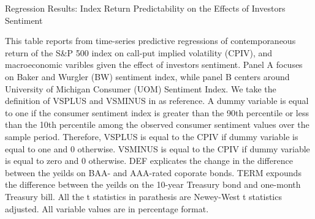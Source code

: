 \begin{table}[h]

\caption{Regression Results: Index Return Predictability on the Effects of Investors Sentiment}\label{table:sentiment}
\begin{threeparttable}

\medskip

{\scriptsize 
This table reports from time-series predictive regressions of contemporaneous return of the S\&P 500 index on call-put implied volatility (CPIV), and macroeconomic varibles given the effect of investors sentiment. Panel A focuses on Baker and Wurgler (BW) sentiment index, while panel B centers around University of Michigan Consumer (UOM) Sentiment Index. We take the definition of VSPLUS and VSMINUS in \textcite{atilgan2015implied} as reference. A dummy variable is equal to one if the consumer sentiment index is greater than the 90th percentile or less than the 10th percentile among the observed consumer sentiment values over the sample period. Therefore, VSPLUS is equal to the CPIV if dummy variable is equal to one and 0 otherwise. VSMINUS is equal to the CPIV if dummy variable is equal to zero and 0 otherwise. DEF explicates the change in the difference between the yeilds on BAA- and AAA-rated coporate bonds. TERM expounds the difference between the yeilds on the 10-year Treasury bond and one-month Treasury bill. All the t statistics in parathesis are Newey-West t statistics adjusted. All variable values are in percentage format.  
}
\medskip


\begin{subtable}[t]{\linewidth}


\end{subtable}
\end{threeparttable}
\end{table}
